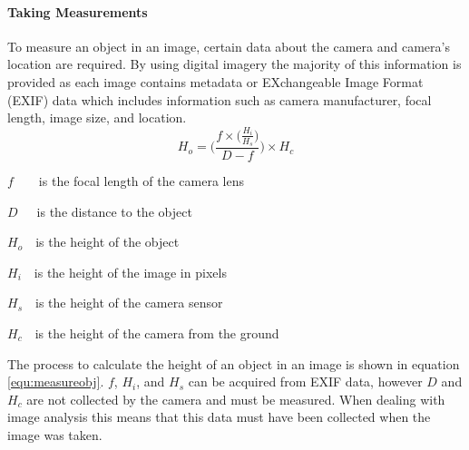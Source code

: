 	\paragraph{Taking Measurements}\label{sec:taking_measurements}
	To measure an object in an image, certain data about the camera and camera's location are 
	required. By using digital imagery the majority of this information is provided as each image 
	contains metadata or EXchangeable Image Format (EXIF) data which includes information such as 
	camera manufacturer, focal length, image size, and location.
	\begin{equation}
		\label{equ:measureobj}
		H_{o} = \Bigg(\frac{f\times\big(\frac{H_{i}}{H_{s}}\big)}{D - f}\Bigg)\times H_{c}
	\end{equation}
	\begin{where}
		\item $f$~~~~is the focal length of the camera lens
		\item $D$~~~is the distance to the object
		\item $H_{o}$~~is the height of the object
		\item $H_{i}$~~is the height of the image in pixels
		\item $H_{s}$~~is the height of the camera sensor
		\item $H_{c}$~~is the height of the camera from the ground
	\end{where}

	\vspace{5mm}
	The process to calculate the height of an object in an image is shown in equation \ref{equ:measureobj}. $f$, $H_{i}$, and $H_{s}$ can be acquired from EXIF data, however $D$ and $H_{c}$ are not collected by the camera and must be measured. When dealing with image analysis this means that this data must have been collected when the image was taken.
